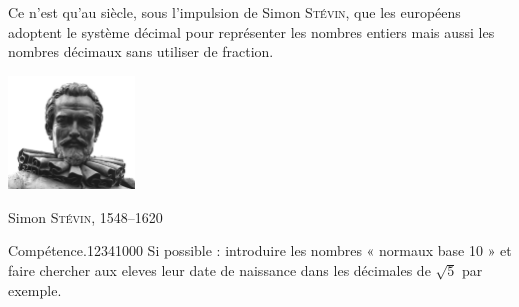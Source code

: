 {\begin{His}
{Ce n'est qu'au \ieme siècle, sous l'impulsion de Simon \textsc{Stévin},
 que les européens adoptent le système
 décimal pour représenter les nombres entiers mais aussi les nombres
 décimaux sans utiliser de fraction.}
\parbox[t]{0.39\textwidth}{
\begin{center}
\includegraphics[height=3cm]{FIG/stevin}

Simon \textsc{Stévin}, 1548--1620
\end{center}
} 
\end{His}

\begin{ExoDec}{Compétence.}{1234}{1}{0}{0}{0}
Si possible : introduire les nombres « normaux base 10 » et faire chercher aux eleves
leur date de naissance dans les décimales de $\sqrt 5$ par exemple.

\end{ExoDec}
}


